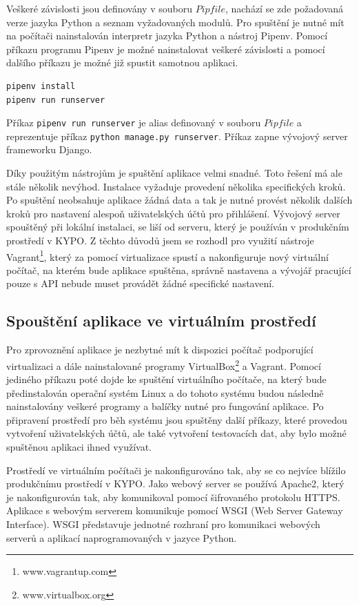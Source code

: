 \documentclass[
  digital, %
  twoside, %
  table,   %
  lof,     %
  lot,     %
]{fithesis3}
\begin{document}
Veškeré závislosti jsou definovány v souboru $Pipfile$, nachází se zde požadovaná verze jazyka Python a seznam vyžadovaných modulů. Pro spuštění je nutné mít na počítači nainstalován interpretr jazyka Python a nástroj Pipenv. Pomocí příkazu programu Pipenv je možné nainstalovat veškeré závislosti a pomocí dalšího příkazu je možné již spustit samotnou aplikaci.

\begin{lstlisting}
pipenv install
pipenv run runserver
\end{lstlisting}

Příkaz \lstinline[columns=fixed]{pipenv run runserver} je alias definovaný v souboru $Pipfile$ a reprezentuje příkaz \lstinline[columns=fixed]{python manage.py runserver}. Příkaz zapne vývojový server frameworku Django.

Díky použitým nástrojům je spuštění aplikace velmi snadné. Toto řešení má ale stále několik nevýhod. Instalace vyžaduje provedení několika specifických kroků. Po spuštění neobsahuje aplikace žádná data a tak je nutné provést několik dalších kroků pro nastavení alespoň uživatelských účtů pro přihlášení. Vývojový server spouštěný při lokální instalaci, se liší od serveru, který je používán v produkčním prostředí v KYPO. Z těchto důvodů jsem se rozhodl pro využití nástroje Vagrant\footnote{www.vagrantup.com}, který za pomocí virtualizace spustí a nakonfiguruje nový virtuální počítač, na kterém bude aplikace spuštěna, správně nastavena a vývojář pracující pouze s API nebude muset provádět žádné specifické nastavení.

\subsection{Spouštění aplikace ve virtuálním prostředí}

Pro zprovoznění aplikace je nezbytné mít k dispozici počítač podporující virtualizaci a dále nainstalované programy VirtualBox\footnote{www.virtualbox.org} a Vagrant. Pomocí jediného příkazu poté dojde ke spuštění virtuálního počítače, na který bude předinstalován operační systém Linux a do tohoto systému budou následně nainstalovány veškeré programy a balíčky nutné pro fungování aplikace. Po připravení prostředí pro běh systému jsou spuštěny další příkazy, které provedou vytvoření uživatelských účtů, ale také vytvoření testovacích dat, aby bylo možné spuštěnou aplikaci ihned využívat. 

Prostředí ve virtuálním počítači je nakonfigurováno tak, aby se co nejvíce blížilo produkčnímu prostředí v KYPO. Jako webový server se používá Apache2, který je nakonfigurován tak, aby komunikoval pomocí šifrovaného protokolu HTTPS. Aplikace s webovým serverem komunikuje pomocí WSGI (Web Server Gateway Interface). WSGI představuje jednotné rozhraní pro komunikaci webových serverů a aplikací naprogramovaných v jazyce Python.
\end{document}
